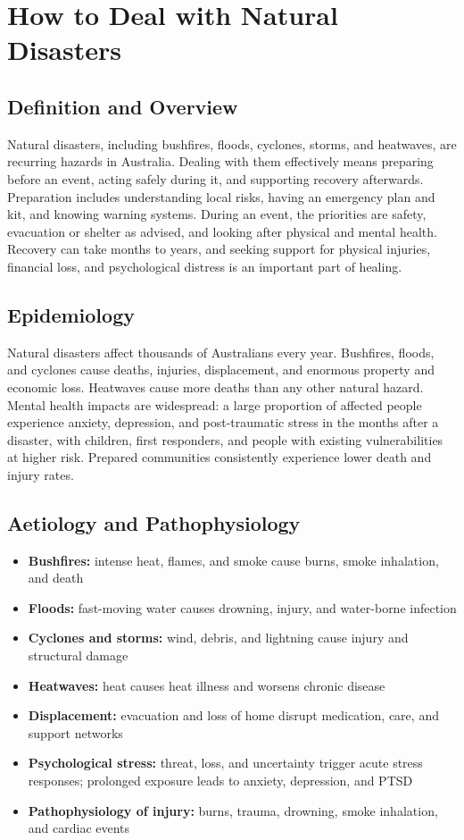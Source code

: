 \chapter{How to Deal with Natural Disasters}

\section*{Definition and Overview}
Natural disasters, including bushfires, floods, cyclones, storms, and heatwaves, are recurring hazards in Australia. Dealing with them effectively means preparing before an event, acting safely during it, and supporting recovery afterwards. Preparation includes understanding local risks, having an emergency plan and kit, and knowing warning systems. During an event, the priorities are safety, evacuation or shelter as advised, and looking after physical and mental health. Recovery can take months to years, and seeking support for physical injuries, financial loss, and psychological distress is an important part of healing.

\section*{Epidemiology}
Natural disasters affect thousands of Australians every year. Bushfires, floods, and cyclones cause deaths, injuries, displacement, and enormous property and economic loss. Heatwaves cause more deaths than any other natural hazard. Mental health impacts are widespread: a large proportion of affected people experience anxiety, depression, and post-traumatic stress in the months after a disaster, with children, first responders, and people with existing vulnerabilities at higher risk. Prepared communities consistently experience lower death and injury rates.

\section*{Aetiology and Pathophysiology}
\begin{itemize}
    \item \textbf{Bushfires:} intense heat, flames, and smoke cause burns, smoke inhalation, and death
    \item \textbf{Floods:} fast-moving water causes drowning, injury, and water-borne infection
    \item \textbf{Cyclones and storms:} wind, debris, and lightning cause injury and structural damage
    \item \textbf{Heatwaves:} heat causes heat illness and worsens chronic disease
    \item \textbf{Displacement:} evacuation and loss of home disrupt medication, care, and support networks
    \item \textbf{Psychological stress:} threat, loss, and uncertainty trigger acute stress responses; prolonged exposure leads to anxiety, depression, and PTSD
    \item \textbf{Pathophysiology of injury:} burns, trauma, drowning, smoke inhalation, and cardiac events
\end{itemize}

